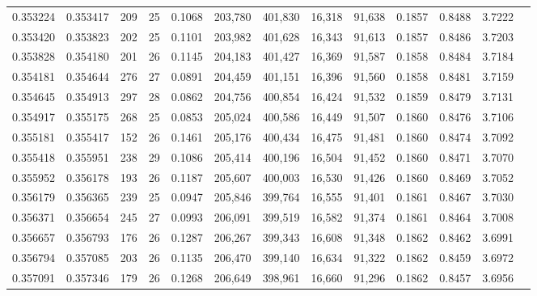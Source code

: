 \begin{tabular}{rrrrrrrrrrrrr}
0.353224 & 0.353417 &   209 &  25 &                                     0.1068 & 203,780 & 401,830 &  16,318 &  91,638 & 0.1857 & 0.8488 & 3.7222 \\
0.353420 & 0.353823 &   202 &  25 &                                     0.1101 & 203,982 & 401,628 &  16,343 &  91,613 & 0.1857 & 0.8486 & 3.7203 \\
0.353828 & 0.354180 &   201 &  26 &                                     0.1145 & 204,183 & 401,427 &  16,369 &  91,587 & 0.1858 & 0.8484 & 3.7184 \\
0.354181 & 0.354644 &   276 &  27 &                                     0.0891 & 204,459 & 401,151 &  16,396 &  91,560 & 0.1858 & 0.8481 & 3.7159 \\
0.354645 & 0.354913 &   297 &  28 &                                     0.0862 & 204,756 & 400,854 &  16,424 &  91,532 & 0.1859 & 0.8479 & 3.7131 \\
0.354917 & 0.355175 &   268 &  25 &                                     0.0853 & 205,024 & 400,586 &  16,449 &  91,507 & 0.1860 & 0.8476 & 3.7106 \\
0.355181 & 0.355417 &   152 &  26 &                                     0.1461 & 205,176 & 400,434 &  16,475 &  91,481 & 0.1860 & 0.8474 & 3.7092 \\
0.355418 & 0.355951 &   238 &  29 &                                     0.1086 & 205,414 & 400,196 &  16,504 &  91,452 & 0.1860 & 0.8471 & 3.7070 \\
0.355952 & 0.356178 &   193 &  26 &                                     0.1187 & 205,607 & 400,003 &  16,530 &  91,426 & 0.1860 & 0.8469 & 3.7052 \\
0.356179 & 0.356365 &   239 &  25 &                                     0.0947 & 205,846 & 399,764 &  16,555 &  91,401 & 0.1861 & 0.8467 & 3.7030 \\
0.356371 & 0.356654 &   245 &  27 &                                     0.0993 & 206,091 & 399,519 &  16,582 &  91,374 & 0.1861 & 0.8464 & 3.7008 \\
0.356657 & 0.356793 &   176 &  26 &                                     0.1287 & 206,267 & 399,343 &  16,608 &  91,348 & 0.1862 & 0.8462 & 3.6991 \\
0.356794 & 0.357085 &   203 &  26 &                                     0.1135 & 206,470 & 399,140 &  16,634 &  91,322 & 0.1862 & 0.8459 & 3.6972 \\
0.357091 & 0.357346 &   179 &  26 &                                     0.1268 & 206,649 & 398,961 &  16,660 &  91,296 & 0.1862 & 0.8457 & 3.6956 \\

\end{tabular}
